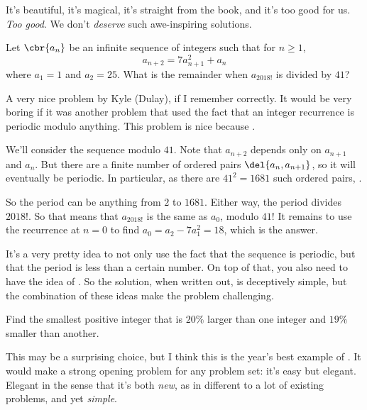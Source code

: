 \documentclass[11pt,paper=letter]{scrartcl}
\begin{document}
It's beautiful, it's magical, it's straight from the book, and it's too good for us. \emph{Too good}. We don't \emph{deserve} such awe-inspiring solutions.

\begin{probboxed}
   Let $\cbr{a_n}$ be an infinite sequence of integers such that for $n \geq 1$, $$a_{n+2} = 7a_{n+1}^2 + a_n$$ where $a_1 = 1$ and $a_2 = 25$. What is the remainder when $a_{2018!}$ is divided by $41$?
\end{probboxed}

A very nice problem by Kyle (Dulay), if I remember correctly. It would be very boring if it was another problem that used the fact that an integer recurrence is periodic modulo anything. This problem is nice because .

We'll consider the sequence modulo $41$. Note that $a_{n+2}$ depends only on $a_{n+1}$ and $a_n$. But there are a finite number of ordered pairs $\del{a_n, a_{n+1}}$, so it will eventually be periodic. In particular, as there are $41^2 = 1681$ such ordered pairs, .

So the period can be anything from $2$ to $1681$. Either way, the period divides $2018!$. So that means that $a_{2018!}$ is the same as $a_0$, modulo $41$! It remains to use the recurrence at $n = 0$ to find $a_0 = a_2 - 7a_1^2 = 18$, which is the answer.

It's a very pretty idea to not only use the fact that the sequence is periodic, but that the period is less than a certain number. On top of that, you also need to have the idea of . So the solution, when written out, is deceptively simple, but the combination of these ideas make the problem challenging.

\begin{probboxed}
   Find the smallest positive integer that is $20\%$ larger than one integer and $19\%$ smaller than another.
\end{probboxed}

This may be a surprising choice, but I think this is the year's best example of . It would make a strong opening problem for any problem set: it's easy but elegant. Elegant in the sense that it's both \emph{new}, as in different to a lot of existing problems, and yet \emph{simple}. 
\end{document}

